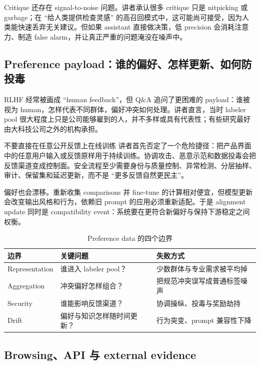 \documentclass[a4paper]{article}
\begin{document}
Critique 还存在 signal-to-noise 问题。讲者承认很多 critique 只是 nitpicking 或 garbage；在 ``给人类提供检查灵感'' 的高召回模式中，这可能尚可接受，因为人类能快速丢弃无关建议。但如果 assistant 直接做决策，低 precision 会消耗注意力、制造 false alarm，并让真正严重的问题淹没在噪声中。

\subsection{Preference payload：谁的偏好、怎样更新、如何防投毒}

RLHF 经常被画成 ``human feedback''，但 Q\&A 追问了更困难的 payload：谁被视为 human，怎样代表不同群体，偏好冲突如何处理。讲者直言，当时 labeler pool 很大程度上只是公司能够雇到的人，并不多样或具有代表性；有些研究最好由大科技公司之外的机构承担。

\begin{importantbox}{不要直接在任意公开反馈上在线训练}
讲者首先否定了一个危险捷径：把产品界面中的任意用户输入或反馈原样用于持续训练。协调攻击、恶意示范和数据投毒会把反馈渠道变成控制面。安全流程至少需要身份与质量控制、异常检测、分层抽样、审计、保留集和延迟更新，而不是 ``更多反馈自然更民主''。
\end{importantbox}

偏好也会漂移。重新收集 comparisons 并 fine-tune 的计算相对便宜，但模型更新会改变输出风格和行为，依赖旧 prompt 的应用必须重新适配。于是 alignment update 同时是 compatibility event：系统要在更符合新偏好与保持下游稳定之间权衡。

\begin{table}[H]
\centering
\caption{Preference data 的四个边界}
\begin{tabularx}{\textwidth}{L{2.5cm} X X}
\toprule
边界 & 关键问题 & 失败方式 \\
\midrule
Representation & 谁进入 labeler pool？ & 少数群体与专业需求被平均掉 \\
Aggregation & 冲突偏好怎样组合？ & 把规范冲突误写成普通标签噪声 \\
Security & 谁能影响反馈渠道？ & 协调操纵、投毒与奖励劫持 \\
Drift & 偏好与知识怎样随时间更新？ & 行为突变、prompt 兼容性下降 \\
\bottomrule
\end{tabularx}
\end{table}

\subsection{Browsing、API 与 external evidence}
\end{document}

